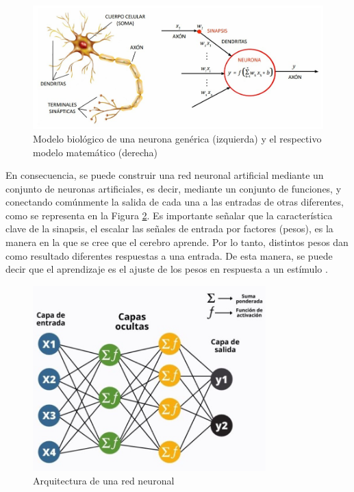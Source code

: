 \begin{figure} [H]
    \begin{center}
      \includegraphics[width=15cm]{figs/Modelo neurona.jpeg}
    \end{center}
    \caption{Modelo biológico de una neurona genérica (izquierda) y el respectivo modelo matemático (derecha)}
    \label{fig:Modelo neurona}
\end{figure}

En consecuencia, se puede construir una red neuronal artificial mediante un conjunto de neuronas artificiales, es decir, mediante un conjunto de funciones, y conectando comúnmente la salida de cada una a las entradas de otras diferentes, como se representa en la Figura \ref{fig:Arquitectura red neuronal}. %
Es importante señalar que la característica clave de la sinapsis, el escalar las señales de entrada por factores (pesos), es la manera en la que se cree que el cerebro aprende. Por lo tanto, distintos pesos dan como resultado diferentes respuestas a una entrada. De esta manera, se puede decir que el aprendizaje es el ajuste de los pesos en respuesta a un estímulo \cite{Dinamarca18}.\\

\begin{figure} [H]
    \begin{center}
      \includegraphics[width=9cm]{figs/capas rrnn.jpeg}
    \end{center}
    \caption{Arquitectura de una red neuronal}
    \label{fig:Arquitectura red neuronal}
\end{figure}

